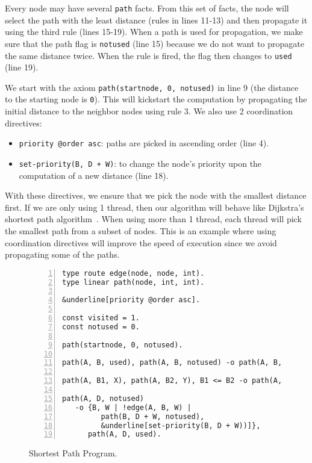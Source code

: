 Every node may have several \texttt{path} facts. From this set of facts, the node will select
the path with the least distance (rules in lines 11-13) and then propagate it using the third rule (lines 15-19).
When a path is used for propagation, we make sure that the path flag is \texttt{notused} (line 15)
because we do not want to propagate the same distance twice. When the rule is fired, the flag
then changes to \texttt{used} (line 19).

We start with the axiom \texttt{path(startnode,~0,~notused)} in line 9 (the distance to the starting
node is \texttt{0}). This will kickstart the computation by propagating the initial distance to the
neighbor nodes using rule 3. We also use 2 coordination directives:

\begin{itemize}
   \item \texttt{priority~@order~asc}: paths are picked in ascending order (line 4).
   \item \texttt{set-priority(B,~D~+~W)}: to change the node's priority upon the computation of
a new distance (line 18).
\end{itemize}

With these directives, we ensure that we pick the node with the smallest distance
first. If we are only using 1 thread, then our algorithm will behave like Dijkstra's shortest
path algorithm~\cite{Dijkstra}. When using more than 1 thread, each thread will pick the smallest
path from a subset of nodes. This is an example where using coordination directives will
improve the speed of execution since we avoid propagating some of the paths.

\begin{figure}[h!]
\small\begin{Verbatim}[numbers=left,commandchars=&\[\]]
type route edge(node, node, int).
type linear path(node, int, int).

&underline[priority @order asc].

const visited = 1.
const notused = 0.

path(startnode, 0, notused).

path(A, B, used), path(A, B, notused) -o path(A, B, used).

path(A, B1, X), path(A, B2, Y), B1 <= B2 -o path(A, B1, X).

path(A, D, notused)
   -o {B, W | !edge(A, B, W) |
         path(B, D + W, notused),
         &underline[set-priority(B, D + W))]},
      path(A, D, used).
\end{Verbatim}
  \caption{Shortest Path Program.}
  \label{code:shortest_path_program}
\end{figure}
\normalsize

